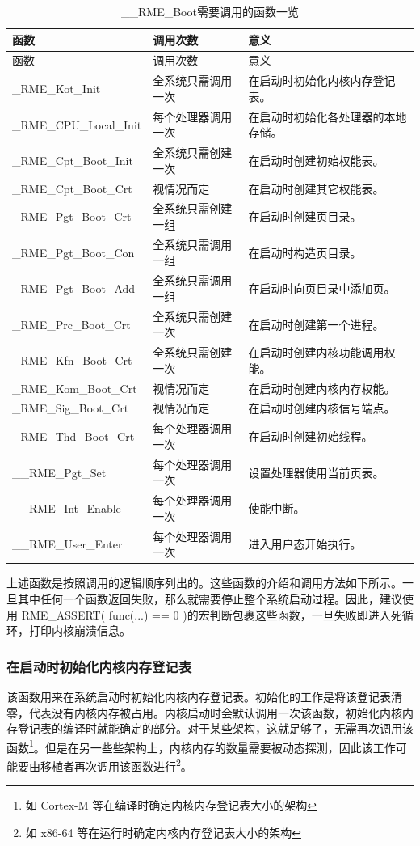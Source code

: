 \begin{xltabular}{\textwidth}{@{}>{\hsize\raggedright\arraybackslash}X>{\hsize\raggedright\arraybackslash}X>{\hsize\raggedright\arraybackslash}X@{}}
\caption{\_\_RME\_Boot需要调用的函数一览}\label{tab:7-37-rme-boot-called-functions-overview}\\
\toprule
函数 & 调用次数 & 意义\tabularnewline
\endfirsthead
\toprule
函数 & 调用次数 & 意义\tabularnewline
\midrule
\endhead
\bottomrule
\endlastfoot
\_RME\_Kot\_Init & 全系统只需调用一次 &
在启动时初始化内核内存登记表。\tabularnewline
\_RME\_CPU\_Local\_Init & 每个处理器调用一次 &
在启动时初始化各处理器的本地存储。\tabularnewline
\_RME\_Cpt\_Boot\_Init & 全系统只需创建一次 &
在启动时创建初始权能表。\tabularnewline
\_RME\_Cpt\_Boot\_Crt & 视情况而定 &
在启动时创建其它权能表。\tabularnewline
\_RME\_Pgt\_Boot\_Crt & 全系统只需创建一组 &
在启动时创建页目录。\tabularnewline
\_RME\_Pgt\_Boot\_Con & 全系统只需调用一组 &
在启动时构造页目录。\tabularnewline
\_RME\_Pgt\_Boot\_Add & 全系统只需调用一组 &
在启动时向页目录中添加页。\tabularnewline
\_RME\_Prc\_Boot\_Crt & 全系统只需创建一次 &
在启动时创建第一个进程。\tabularnewline
\_RME\_Kfn\_Boot\_Crt & 全系统只需创建一次 &
在启动时创建内核功能调用权能。\tabularnewline
\_RME\_Kom\_Boot\_Crt & 视情况而定 &
在启动时创建内核内存权能。\tabularnewline
\_RME\_Sig\_Boot\_Crt & 视情况而定 &
在启动时创建内核信号端点。\tabularnewline
\_RME\_Thd\_Boot\_Crt & 每个处理器调用一次 &
在启动时创建初始线程。\tabularnewline
\_\_RME\_Pgt\_Set & 每个处理器调用一次 &
设置处理器使用当前页表。\tabularnewline
\_\_RME\_Int\_Enable & 每个处理器调用一次 & 使能中断。\tabularnewline
\_\_RME\_User\_Enter & 每个处理器调用一次 &
进入用户态开始执行。\tabularnewline
\end{xltabular}

上述函数是按照调用的逻辑顺序列出的。这些函数的介绍和调用方法如下所示。一旦其中任何一个函数返回失败，那么就需要停止整个系统启动过程。因此，建议使用 RME\_ASSERT( func(...) == 0 )的宏判断包裹这些函数，一旦失败即进入死循环，打印内核崩溃信息。

\subsubsection{在启动时初始化内核内存登记表}\label{subsubsec:7-init-kernel-object-table-at-boot}

该函数用来在系统启动时初始化内核内存登记表。初始化的工作是将该登记表清零，代表没有内核内存被占用。内核启动时会默认调用一次该函数，初始化内核内存登记表的编译时就能确定的部分。对于某些架构，这就足够了，无需再次调用该函数\footnote{如 Cortex-M 等在编译时确定内核内存登记表大小的架构}。但是在另一些些架构上，内核内存的数量需要被动态探测，因此该工作可能要由移植者再次调用该函数进行\footnote{如 x86-64 等在运行时确定内核内存登记表大小的架构}。

